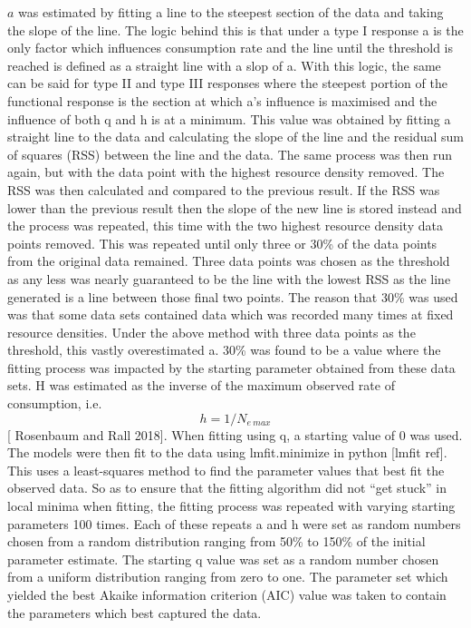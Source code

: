 \documentclass[a4paper]{article}
\numberwithin{equation}{section}
\begin{document}
$a$ was estimated by fitting a line to the steepest section of the data and taking the slope of the line.  The logic behind this is that under a type I response a is the only factor which influences consumption rate and the line until the threshold is reached is defined as a straight line with a slop of a.  With this logic, the same can be said for type II and type III responses where the steepest portion of the functional response is the section at which a’s influence is maximised and the influence of both q and h is at a minimum.  This value was obtained by fitting a straight line to the data and calculating the slope of the line and the residual sum of squares (RSS) between the line and the data.  The same process was then run again, but with the data point with the highest resource density removed.  The RSS was then calculated and compared to the previous result.  If the RSS was lower than the previous result then the slope of the new line is stored instead and the process was repeated, this time with the two highest resource density data points removed.  This was repeated until only three or 30\% of the data points from the original data remained.  Three data points was chosen as the threshold as any less was nearly guaranteed to be the line with the lowest RSS as the line generated is a line between those final two points.  The reason that 30\% was used was that some data sets contained data which was recorded many times at fixed resource densities.  Under the above method with three data points as the threshold, this vastly overestimated a.  30\% was found to be a value where the fitting process was impacted by the starting parameter obtained from these data sets.
\newline
H was estimated as the inverse of the maximum observed rate of consumption, i.e. $$h = 1/N_{e \ max}$$ \cite{Rosenbaum2018}[ Rosenbaum and Rall 2018]. 
\newline 
When fitting using q, a starting value of 0 was used. 
\newline 
The models were then fit to the data using lmfit.minimize in python [lmfit ref].  This uses a least-squares method to find the parameter values that best fit the observed data.  So as to ensure that the fitting algorithm did not “get stuck” in local minima when fitting, the fitting process was repeated with varying starting parameters 100 times.  Each of these repeats a and h were set as random numbers chosen from a random distribution ranging from 50\% to 150\% of the initial parameter estimate.  The starting q value was set as a random number chosen from a uniform distribution ranging from zero to one.  The parameter set which yielded the best Akaike information criterion (AIC) value was taken to contain the parameters which best captured the data.  
\end{document}
